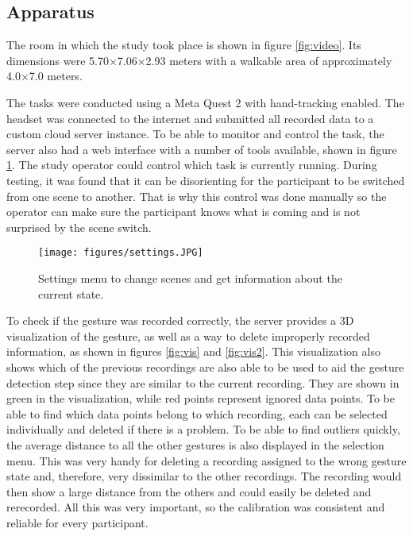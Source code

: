 



\subsection{Apparatus}

The room in which the study took place is shown in figure \ref{fig:video}. Its dimensions were 5.70×7.06×2.93 meters with a walkable area of approximately 4.0×7.0 meters.

The tasks were conducted using a Meta Quest 2 with hand-tracking enabled. The headset was connected to the internet and submitted all recorded data to a custom cloud server instance. To be able to monitor and control the task, the server also had a web interface with a number of tools available, shown in figure \ref{fig:settings}. The study operator could control which task is currently running. During testing, it was found that it can be disorienting for the participant to be switched from one scene to another. That is why this control was done manually so the operator can make sure the participant knows what is coming and is not surprised by the scene switch.

\begin{figure}[!ht]
    \centering
    \texttt{[image: figures/settings.JPG]}
    \caption{Settings menu to change scenes and get information about the current state.}
    \label{fig:settings}
\end{figure}

To check if the gesture was recorded correctly, the server provides a 3D visualization of the gesture, as well as a way to delete improperly recorded information, as shown in figures \ref{fig:vis} and  \ref{fig:vis2}. This visualization also shows which of the previous recordings are also able to be used to aid the gesture detection step since they are similar to the current recording. They are shown in green in the visualization, while red points represent ignored data points. To be able to find which data points belong to which recording, each can be selected individually and deleted if there is a problem. To be able to find outliers quickly, the average distance to all the other gestures is also displayed in the selection menu. This was very handy for deleting a recording assigned to the wrong gesture state and, therefore, very dissimilar to the other recordings. The recording would then show a large distance from the others and could easily be deleted and rerecorded. All this was very important, so the calibration was consistent and reliable for every participant.

